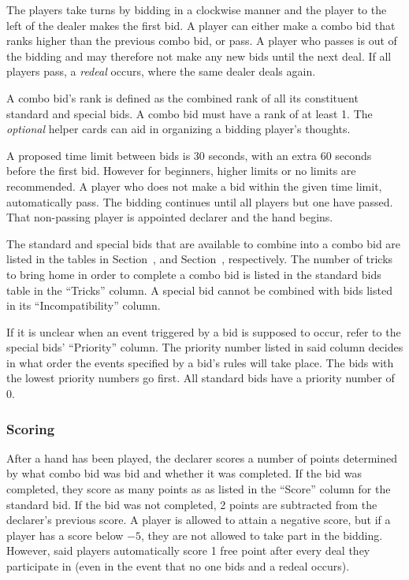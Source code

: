 \documentclass[a4paper]{article} %
\begin{document}
	The players take turns by bidding in a clockwise manner and the player to the left of the dealer makes the first bid. A player can either make a combo bid that ranks higher than the previous combo bid, or pass. A player who passes is out of the bidding and may therefore not make any new bids until the next deal. If all players pass, a \emph{redeal} occurs, where the same dealer deals again.

	A combo bid's rank is defined as the combined rank of all its constituent standard and special bids. A combo bid must have a rank of at least 1. The \emph{optional} helper cards can aid in organizing a bidding player's thoughts.

	A proposed time limit between bids is 30 seconds, with an extra 60 seconds before the first bid. However for beginners, higher limits or no limits are recommended. A player who does not make a bid within the given time limit, automatically pass. The bidding continues until all players but one have passed. That non-passing player is appointed declarer and the hand begins.

	The standard and special bids that are available to combine into a combo bid are listed in the tables in Section~, and Section~, respectively. The number of tricks to bring home in order to complete a combo bid is listed in the standard bids table in the ``Tricks'' column. A special bid cannot be combined with bids listed in its ``Incompatibility'' column.

	If it is unclear when an event triggered by a bid is supposed to occur, refer to the special bids' ``Priority'' column. The priority number listed in said column decides in what order the events specified by a bid's rules will take place. The bids with the lowest priority numbers go first. All standard bids have a priority number of 0.

	\subsubsection{Scoring}
	After a hand has been played, the declarer scores a number of points determined by what combo bid was bid and whether it was completed. If the bid was completed, they score as many points as as listed in the ``Score'' column for the standard bid. If the bid was not completed, 2 points are subtracted from the declarer's previous score. A player is allowed to attain a negative score, but if a player has a score below $-5$, they are not allowed to take part in the bidding. However, said players automatically score 1 free point after every deal they participate in (even in the event that no one bids and a redeal occurs).
\end{document}
